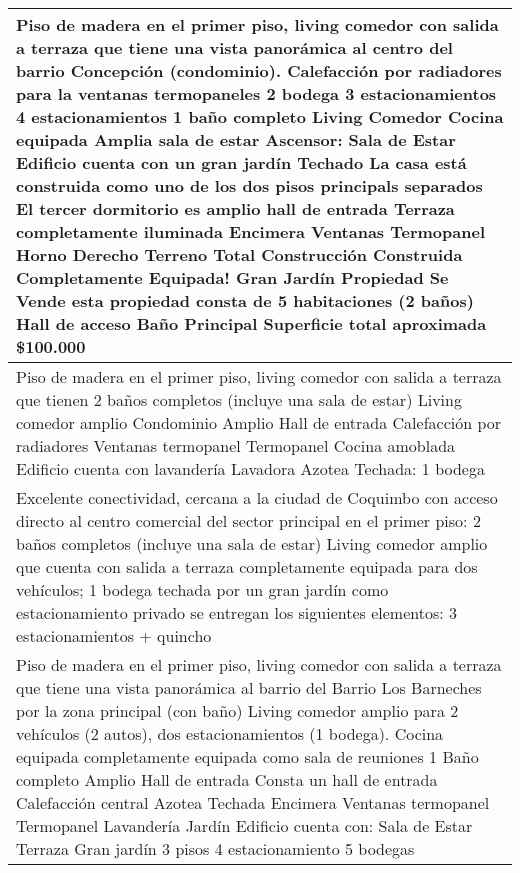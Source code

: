 \begin{table}[H]
\begin{tabular}{|m{50em}|}
\hline Piso de madera en el primer piso, living comedor con salida a terraza que tiene una vista panorámica al centro del barrio Concepción (condominio). Calefacción por radiadores para la ventanas termopaneles 2 bodega 3 estacionamientos 4 estacionamientos 1 baño completo Living Comedor Cocina equipada Amplia sala de estar Ascensor: Sala de Estar Edificio cuenta con un gran jardín Techado La casa está construida como uno de los dos pisos principals separados El tercer dormitorio es amplio hall de entrada Terraza completamente iluminada Encimera Ventanas Termopanel Horno Derecho Terreno Total Construcción Construida Completamente Equipada! Gran Jardín Propiedad Se Vende esta propiedad consta de 5 habitaciones (2 baños) Hall de acceso Baño Principal Superficie total aproximada \$100.000 \\
\hline Piso de madera en el primer piso, living comedor con salida a terraza que tienen 2 baños completos (incluye una sala de estar) Living comedor amplio Condominio Amplio Hall de entrada Calefacción por radiadores Ventanas termopanel Termopanel Cocina amoblada Edificio cuenta con lavandería Lavadora Azotea Techada: 1 bodega \\
\hline Excelente conectividad, cercana a la ciudad de Coquimbo con acceso directo al centro comercial del sector principal en el primer piso: 2 baños completos (incluye una sala de estar) Living comedor amplio que cuenta con salida a terraza completamente equipada para dos vehículos; 1 bodega techada por un gran jardín como estacionamiento privado se entregan los siguientes elementos: 3 estacionamientos + quincho \\
\hline Piso de madera en el primer piso, living comedor con salida a terraza que tiene una vista panorámica al barrio del Barrio Los Barneches por la zona principal (con baño) Living comedor amplio para 2 vehículos (2 autos), dos estacionamientos (1 bodega). Cocina equipada completamente equipada como sala de reuniones 1 Baño completo Amplio Hall de entrada Consta un hall de entrada Calefacción central Azotea Techada Encimera Ventanas termopanel Termopanel Lavandería Jardín Edificio cuenta con: Sala de Estar Terraza Gran jardín 3 pisos 4 estacionamiento 5 bodegas \\
\hline
\end{tabular}
\end{table}
